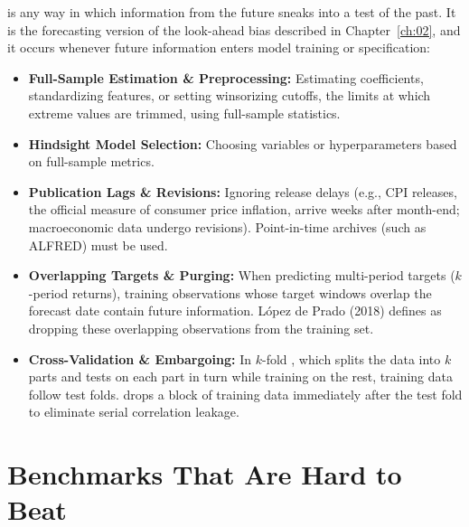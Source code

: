  is any way in which information from the future sneaks into a test of the past. It is the forecasting version of the look-ahead bias described in Chapter~\ref{ch:02}, and it occurs whenever future information enters model training or specification:
\begin{itemize}
  \item \textbf{Full-Sample Estimation \& Preprocessing:} Estimating coefficients, standardizing features, or setting winsorizing cutoffs, the limits at which extreme values are trimmed, using full-sample statistics.
  \item \textbf{Hindsight Model Selection:} Choosing variables or hyperparameters based on full-sample metrics.
  \item \textbf{Publication Lags \& Revisions:} Ignoring release delays (e.g., CPI releases, the official measure of consumer price inflation, arrive weeks after month-end; macroeconomic data undergo revisions). Point-in-time archives (such as ALFRED) must be used.
  \item \textbf{Overlapping Targets \& Purging:} When predicting multi-period targets ($k$-period returns), training observations whose target windows overlap the forecast date contain future information. López de Prado (2018) defines  as dropping these overlapping observations from the training set.
  \item \textbf{Cross-Validation \& Embargoing:} In $k$-fold , which splits the data into $k$ parts and tests on each part in turn while training on the rest, training data follow test folds.  drops a block of training data immediately after the test fold to eliminate serial correlation leakage.
\end{itemize}

\section{Benchmarks That Are Hard to Beat}
\label{sec:09-benchmarks}

